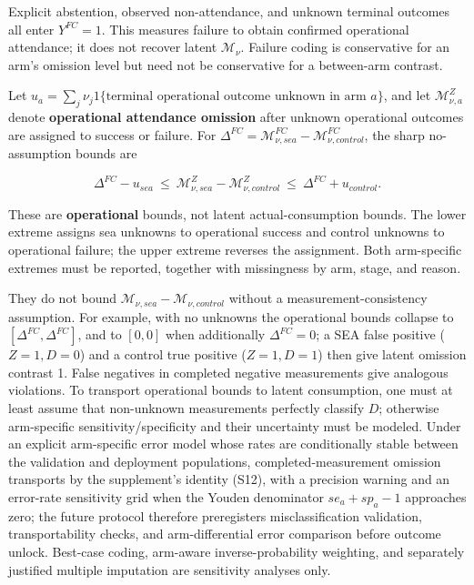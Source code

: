 \documentclass[
  11pt]{article}
\begin{document}
Explicit abstention, observed non-attendance, and unknown terminal
outcomes all enter \(Y^{FC}=1\). This measures failure to obtain
confirmed operational attendance; it does not recover latent
\(\mathcal M_\nu\). Failure coding is conservative for an arm's omission
level but need not be conservative for a between-arm contrast.

Let
\(u_a=\sum_j\nu_j1\{\text{terminal operational outcome unknown in arm }a\}\),
and let \(\mathcal M_{\nu,a}^{Z}\) denote \textbf{operational attendance
omission} after unknown operational outcomes are assigned to success or
failure. For
\(\Delta^{FC}=\mathcal M^{FC}_{\nu,sea}-\mathcal M^{FC}_{\nu,control}\),
the sharp no-assumption bounds are

\[\Delta^{FC}-u_{sea}\ \le\ \mathcal M_{\nu,sea}^{Z}-\mathcal M_{\nu,control}^{Z}\ \le\ \Delta^{FC}+u_{control}.\tag{6}\]

These are \textbf{operational} bounds, not latent actual-consumption
bounds. The lower extreme assigns sea unknowns to operational success
and control unknowns to operational failure; the upper extreme reverses
the assignment. Both arm-specific extremes must be reported, together
with missingness by arm, stage, and reason.

They do not bound \(\mathcal M_{\nu,sea}-\mathcal M_{\nu,control}\)
without a measurement-consistency assumption. For example, with no
unknowns the operational bounds collapse to
\([\Delta^{FC},\Delta^{FC}]\), and to \([0,0]\) when additionally
\(\Delta^{FC}=0\); a SEA false positive (\(Z=1,D=0\)) and a control true
positive (\(Z=1,D=1\)) then give latent omission contrast 1. False
negatives in completed negative measurements give analogous violations.
To transport operational bounds to latent consumption, one must at least
assume that non-unknown measurements perfectly classify \(D\); otherwise
arm-specific sensitivity/specificity and their uncertainty must be
modeled. Under an explicit arm-specific error model whose rates are
conditionally stable between the validation and deployment populations,
completed-measurement omission transports by the supplement's identity
(S12), with a precision warning and an error-rate sensitivity grid when
the Youden denominator \(se_a+sp_a-1\) approaches zero; the future
protocol therefore preregisters misclassification validation,
transportability checks, and arm-differential error comparison before
outcome unlock. Best-case coding, arm-aware inverse-probability
weighting, and separately justified multiple imputation are sensitivity
analyses only.
\end{document}
